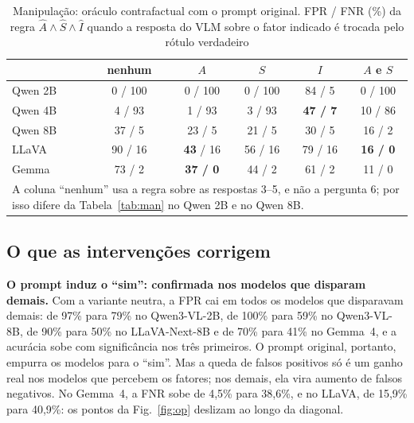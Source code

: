 \documentclass[conference]{IEEEtran}
\begin{document}
\begin{table}[!t]
\renewcommand{\arraystretch}{1.05}
\caption{Manipulação: oráculo contrafactual com o prompt original. FPR / FNR (\%) da regra
$\hat A\wedge\hat S\wedge\hat I$ quando a resposta do VLM sobre o fator indicado é trocada pelo rótulo
verdadeiro}
\label{tab:oraculo}
\centering
\footnotesize
\setlength{\tabcolsep}{2.4pt}
\begin{tabular}{lccccc}
\toprule
 & nenhum & $A$ & $S$ & $I$ & $A$ e $S$ \\
\midrule
Qwen 2B & 0 / 100 & 0 / 100 & 0 / 100 & 84 / 5 & 0 / 100 \\
Qwen 4B & 4 / 93 & 1 / 93 & 3 / 93 & \textbf{47 / 7} & 10 / 86 \\
Qwen 8B & 37 / 5 & 23 / 5 & 21 / 5 & 30 / 5 & 16 / 2 \\
LLaVA & 90 / 16 & \textbf{43} / 16 & 56 / 16 & 79 / 16 & \textbf{16 / 0} \\
Gemma & 73 / 2 & \textbf{37 / 0} & 44 / 2 & 61 / 2 & 11 / 0 \\
\bottomrule
\multicolumn{6}{L{8.2cm}}{\scriptsize A coluna ``nenhum'' usa a regra sobre as respostas 3--5, e não a
pergunta 6; por isso difere da Tabela~\ref{tab:man} no Qwen 2B e no Qwen 8B.}
\end{tabular}
\end{table}

\subsection{O que as intervenções corrigem}
\label{sec:res-hip}
\textbf{O prompt induz o ``sim'': confirmada nos modelos que disparam demais.} Com a variante neutra, a
FPR cai em todos os modelos que disparavam demais: de 97\% para 79\% no Qwen3-VL-2B, de 100\% para 59\% no
Qwen3-VL-8B, de 90\% para 50\% no LLaVA-Next-8B e de 70\% para 41\% no Gemma~4, e a acurácia sobe com
significância nos três primeiros. O prompt original, portanto, empurra os modelos para o ``sim''. Mas a
queda de falsos positivos só é um ganho real nos modelos que percebem os fatores; nos demais, ela vira
aumento de falsos negativos. No Gemma~4, a FNR sobe de 4,5\% para 38,6\%, e no LLaVA, de 15,9\% para
40,9\%: os pontos da Fig.~\ref{fig:op} deslizam ao longo da diagonal.
\end{document}
